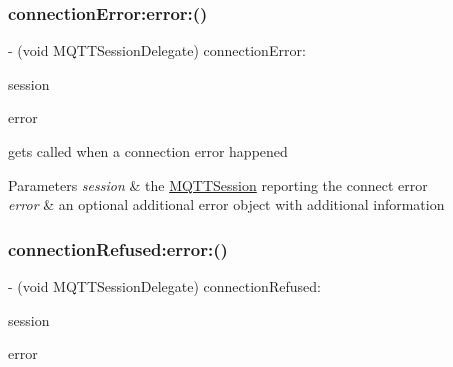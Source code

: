 \subsubsection{\texorpdfstring{connection\+Error\+:error\+:()}{connectionError:error:()}}
{\footnotesize\ttfamily -\/ (void M\+Q\+T\+T\+Session\+Delegate) connection\+Error\+: \begin{DoxyParamCaption}\item[{(\hyperlink{interface_m_q_t_t_session}{M\+Q\+T\+T\+Session} $\ast$)}]{session }\item[{error:(N\+S\+Error $\ast$)}]{error }\end{DoxyParamCaption}\hspace{0.3cm}{\ttfamily [optional]}}

gets called when a connection error happened 
\begin{DoxyParams}{Parameters}
{\em session} & the \hyperlink{interface_m_q_t_t_session}{M\+Q\+T\+T\+Session} reporting the connect error \\
\hline
{\em error} & an optional additional error object with additional information \\
\hline
\end{DoxyParams}
\mbox{\label{protocol_m_q_t_t_session_delegate_01-p_a334a93246a59295ed3da062ef6c0a7fa}} 
\subsubsection{\texorpdfstring{connection\+Refused\+:error\+:()}{connectionRefused:error:()}}
{\footnotesize\ttfamily -\/ (void M\+Q\+T\+T\+Session\+Delegate) connection\+Refused\+: \begin{DoxyParamCaption}\item[{(\hyperlink{interface_m_q_t_t_session}{M\+Q\+T\+T\+Session} $\ast$)}]{session }\item[{error:(N\+S\+Error $\ast$)}]{error }\end{DoxyParamCaption}\hspace{0.3cm}{\ttfamily [optional]}}

